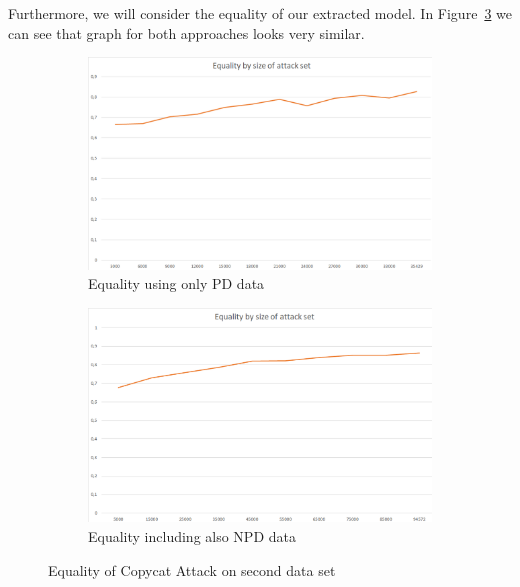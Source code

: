 \documentclass[a4paper,11pt]{article}
\begin{document}
        Furthermore, we will consider the equality of our extracted model. In Figure~\ref{fig:equality_cat} we can see that graph for both approaches looks very similar.
        
         \begin{figure}[h!]
            \centering
            \begin{subfigure}[c]{0.49\textwidth}
                \centering                \includegraphics[width=1\textwidth]{exercise_3/paper/images/Equality_copy_cat_domain.png}
                \caption{Equality using only PD data}
                \label{fig:Equality_cat_PD}
            \end{subfigure}
            \begin{subfigure}[c]{0.49\textwidth}
                \centering                \includegraphics[width=1\textwidth]{exercise_3/paper/images/Equality_copy_cat.png}
                \caption{Equality including also NPD data}
                \label{fig:equality_cat_PD+NPD}
            \end{subfigure}
            \caption{Equality of Copycat Attack on second data set}
            \label{fig:equality_cat}
        \end{figure}
        
\end{document}
